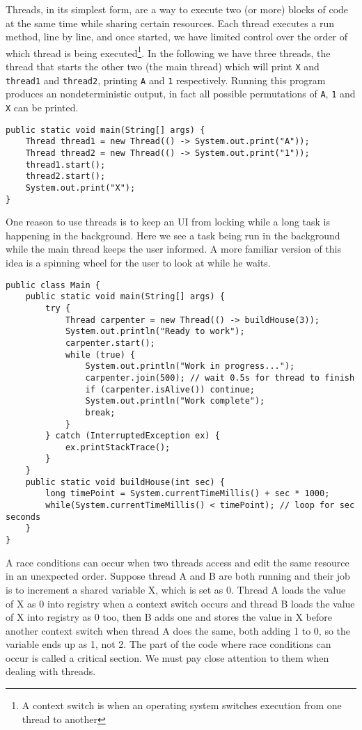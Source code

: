 Threads, in its simplest form, are a way to execute two (or more) blocks of code at the same time while sharing certain resources. Each thread executes a run method, line by line, and once started, we have limited control over the order of which thread is being executed\footnote{A context switch is when an operating system switches execution from one thread to another}. In the following we have three threads, the thread that starts the other two (the main thread) which will print \texttt{X} and \texttt{thread1} and \texttt{thread2}, printing \texttt{A} and \texttt{1} respectively. Running this program produces an nondeterministic output, in fact all possible permutations of \texttt{A}, \texttt{1} and \texttt{X} can be printed.
\begin{lstlisting}[style=A_Java]
public static void main(String[] args) {
    Thread thread1 = new Thread(() -> System.out.print("A"));
    Thread thread2 = new Thread(() -> System.out.print("1"));
    thread1.start();
    thread2.start();
    System.out.print("X");
}
\end{lstlisting}
One reason to use threads is to keep an UI from locking while a long task is happening in the background. Here we see a task being run in the background while the main thread keeps the user informed. A more familiar version of this idea is a spinning wheel for the user to look at while he waits.
\begin{lstlisting}[style=A_Java]
public class Main {
    public static void main(String[] args) {
        try {
            Thread carpenter = new Thread(() -> buildHouse(3));
            System.out.println("Ready to work");
            carpenter.start();
            while (true) {
                System.out.println("Work in progress...");
                carpenter.join(500); // wait 0.5s for thread to finish
                if (carpenter.isAlive()) continue;
                System.out.println("Work complete");
                break;
            }
        } catch (InterruptedException ex) {
            ex.printStackTrace();
        }
    }
    public static void buildHouse(int sec) {
        long timePoint = System.currentTimeMillis() + sec * 1000;
        while(System.currentTimeMillis() < timePoint); // loop for sec seconds
    }
}
\end{lstlisting}
A race conditions can occur when two threads access and edit the same resource in an unexpected order. Suppose thread A and B are both running and their job is to increment a shared variable X, which is set as 0. Thread A loads the value of X as 0 into registry when a context switch occurs and thread B loads the value of X into registry as 0 too, then B adds one and stores the value in X before another context switch when thread A does the same, both adding 1 to 0, so the variable ends up as 1, not 2. The part of the code where race conditions can occur is called a critical section. We must pay close attention to them when dealing with threads.\\

